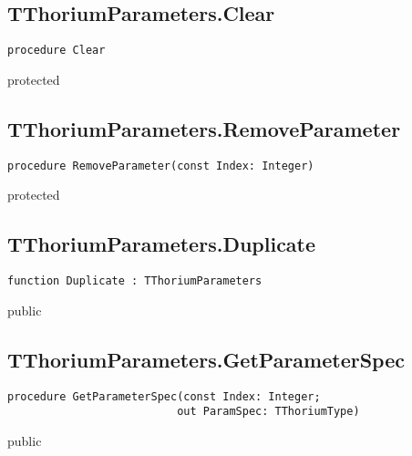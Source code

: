 \subsection{TThoriumParameters.Clear}
\label{thoriumcore:thorium:tthoriumparameters:clear}
\begin{FPCList}
\Synopsis
\Declaration 

\begin{verbatim}
procedure Clear
\end{verbatim}
\Visibility
protected
\Description
\Errors
\end{FPCList}
\subsection{TThoriumParameters.RemoveParameter}
\label{thoriumcore:thorium:tthoriumparameters:removeparameter}
\begin{FPCList}
\Synopsis
\Declaration 

\begin{verbatim}
procedure RemoveParameter(const Index: Integer)
\end{verbatim}
\Visibility
protected
\Description
\Errors
\end{FPCList}
\subsection{TThoriumParameters.Duplicate}
\label{thoriumcore:thorium:tthoriumparameters:duplicate}
\begin{FPCList}
\Synopsis
\Declaration 

\begin{verbatim}
function Duplicate : TThoriumParameters
\end{verbatim}
\Visibility
public
\Description
\Errors
\end{FPCList}
\subsection{TThoriumParameters.GetParameterSpec}
\label{thoriumcore:thorium:tthoriumparameters:getparameterspec}
\begin{FPCList}
\Synopsis
\Declaration 

\begin{verbatim}
procedure GetParameterSpec(const Index: Integer;
                          out ParamSpec: TThoriumType)
\end{verbatim}
\Visibility
public
\Description
\Errors
\end{FPCList}

